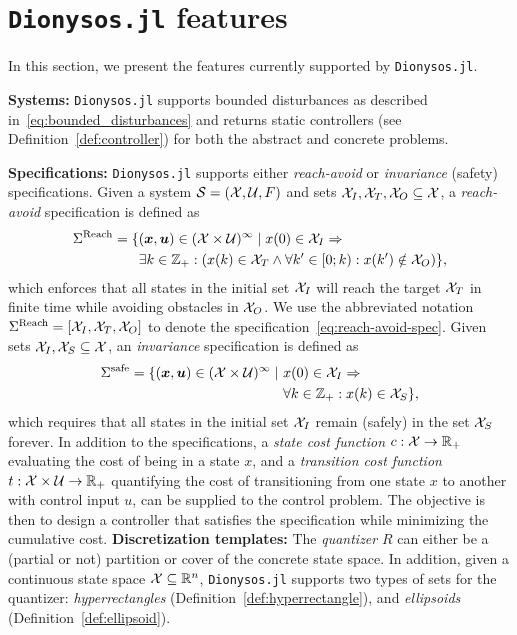 \documentclass{juliacon}
\begin{document}


\section{\texttt{Dionysos.jl} features}
\label{sec:functionalities}
In this section, we present the features currently supported by \texttt{Dionysos.jl}.

\vskip 6pt
\textbf{Systems:} 
\texttt{Dionysos.jl} supports bounded disturbances as described in~\eqref{eq:bounded_disturbances} and returns static controllers (see Definition~\ref{def:controller}) for both the abstract and concrete problems.

\vskip 6pt
\textbf{Specifications:}
\texttt{Dionysos.jl} supports either \emph{reach-avoid} or \emph{invariance} (safety) specifications. 
Given a system $\mathcal{S} = (\mathcal{X},\mathcal{U},F)$ and sets $\mathcal{X}_I, \mathcal{X}_T, \mathcal{X}_O \subseteq \mathcal{X}$, a \emph{reach-avoid} specification is defined as
\begin{align}
\Sigma^{\text{Reach}} = \{ &(\boldsymbol{x},\boldsymbol{u}) \in (\mathcal{X} \times \mathcal{U})^\infty \mid x(0) \in \mathcal{X}_I \Rightarrow \nonumber \\
&\exists k \in \mathbb{Z}_+ : \left(x(k) \in \mathcal{X}_T \land \forall k' \in [0;k):x(k')\notin \mathcal{X}_O\right) \}, \label{eq:reach-avoid-spec}
\end{align}
which enforces that all states in the initial set $\mathcal{X}_I$ will reach the target $\mathcal{X}_T$ in finite time while avoiding obstacles in $\mathcal{X}_O$. We use the abbreviated notation $\Sigma^{\text{Reach}}=[\mathcal{X}_I,\mathcal{X}_T,\mathcal{X}_O]$ to denote the specification~\eqref{eq:reach-avoid-spec}. 
Given sets $\mathcal{X}_I,\mathcal{X}_S\subseteq \mathcal{X}$, an \emph{invariance} specification is defined as
\begin{align}
    \Sigma^{\text{safe}} = \{(\boldsymbol{x},\boldsymbol{u})\in (\mathcal{X}\times \mathcal{U})^{\infty}\mid\ &x(0)\in \mathcal{X}_I \Rightarrow \nonumber \\
    &\forall k \in \mathbb{Z}_+: x(k)\in \mathcal{X}_S\}, \label{eq:invariance-spec} 
\end{align}
which requires that all states in the initial set $\mathcal{X}_I$ remain (safely) in the set $\mathcal{X}_S$ forever.
In addition to the specifications, a \emph{state cost function} $c:\mathcal{X}\rightarrow \mathbb{R}_+$ evaluating the cost of being in a state $x$, and a \emph{transition cost function} $t:\mathcal{X}\times \mathcal{U}\rightarrow \mathbb{R}_+$ quantifying the cost of transitioning from one state $x$ to another with control input $u$, can be supplied to the control problem. The objective is then to design a controller that satisfies the specification while minimizing the cumulative cost.
\vskip 6pt
\textbf{Discretization templates:} The \emph{quantizer} $R$ can either be a (partial or not) partition or cover of the concrete state space. In addition, given a continuous state space $\mathcal{X}\subseteq \mathbb{R}^n$, \texttt{Dionysos.jl} supports two types of sets for the quantizer: \emph{hyperrectangles} (Definition~\ref{def:hyperrectangle}), and \emph{ellipsoids} (Definition~\ref{def:ellipsoid}).
\end{document}
